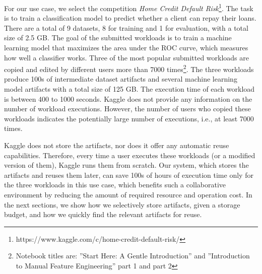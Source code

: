For our use case, we select the competition \textit{Home Credit Default Risk}\footnote{https://www.kaggle.com/c/home-credit-default-risk/}.
The task is to train a classification model to predict whether a client can repay their loans.
There are a total of 9 datasets, 8 for training and 1 for evaluation, with a total size of 2.5 GB.
The goal of the submitted workloads is to train a machine learning model that maximizes the area under the ROC curve, which measures how well a classifier works.
Three of the most popular submitted workloads are copied and edited by different users more than 7000 times\footnote{Notebook titles are: ''Start Here: A Gentle Introduction'' and ''Introduction to Manual Feature Engineering'' part 1 and part 2}.
The three workloads produce 100s of intermediate dataset artifacts and several machine learning model artifacts with a total size of 125 GB.
The execution time of each workload is between 400 to 1000 seconds.
Kaggle does not provide any information on the number of workload executions.
However, the number of users who copied these workloads indicates the potentially large number of executions, i.e., at least 7000 times.

Kaggle does not store the artifacts, nor does it offer any automatic reuse capabilities.
Therefore, every time a user executes these workloads (or a modified version of them), Kaggle runs them from scratch.
Our system, which stores the artifacts and reuses them later, can save 100s of hours of execution time only for the three workloads in this use case, which benefits such a collaborative environment by reducing the amount of required resource and operation cost.
In the next sections, we show how we selectively store artifacts, given a storage budget, and how we quickly find the relevant artifacts for reuse.